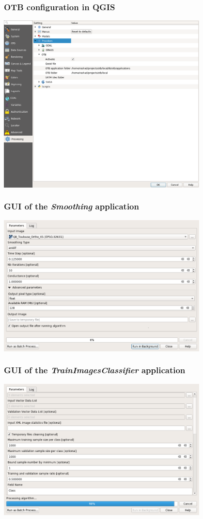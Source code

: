 \begin{frame}
\frametitle{OTB configuration in QGIS}
\begin{center}
\includegraphics[width=0.8\textwidth]{images/qgis_otb_provider_config.png}
\end{center} 
\end{frame}

\begin{frame}
\frametitle{GUI of the \textit{Smoothing} application}
\begin{center}
\includegraphics[width=0.8\textwidth]{images/qgis_smoothing.png}
\end{center} 
\end{frame}

\begin{frame}
\frametitle{GUI of the \textit{TrainImagesClassifier} application}
\begin{center}
\includegraphics[width=0.8\textwidth]{images/qgis_train_classif.png}
\end{center} 
\end{frame}

